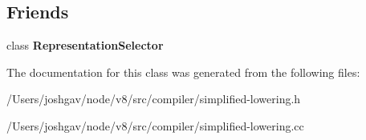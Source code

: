 \subsection*{Friends}
\begin{DoxyCompactItemize}
\item 
class {\bfseries Representation\+Selector}\hypertarget{classv8_1_1internal_1_1compiler_1_1_simplified_lowering_ad8d54b364c13d0305a845ae6fcb97830}{}\label{classv8_1_1internal_1_1compiler_1_1_simplified_lowering_ad8d54b364c13d0305a845ae6fcb97830}

\end{DoxyCompactItemize}


The documentation for this class was generated from the following files\+:\begin{DoxyCompactItemize}
\item 
/\+Users/joshgav/node/v8/src/compiler/simplified-\/lowering.\+h\item 
/\+Users/joshgav/node/v8/src/compiler/simplified-\/lowering.\+cc\end{DoxyCompactItemize}
